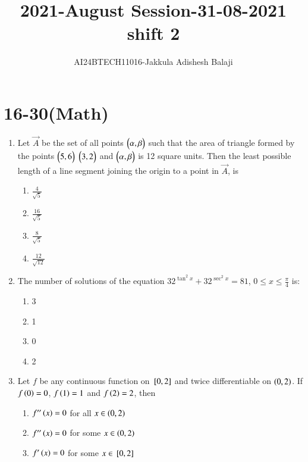 \documentclass[journal]{IEEEtran}
\begin{document}

\title{2021-August Session-31-08-2021 shift 2}
\author{AI24BTECH11016-Jakkula Adishesh Balaji}
{\let\newpage\relax\maketitle}
\renewcommand{\thefigure}{\theenumi}
\renewcommand{\thetable}{\theenumi}
\setlength{\intextsep}{10pt} %
\renewcommand{\thetable}{\theenumi}
\section{16-30(Math)}
\begin{enumerate}
	\item
	Let $\vec{A}$ be the set of all points $\begin{pmatrix}\alpha , \beta\end{pmatrix}$ such that the area of triangle formed by the points $\begin{pmatrix}5 , 6\end{pmatrix}$ $\begin{pmatrix}3 , 2\end{pmatrix}$ and $\begin{pmatrix}\alpha , \beta\end{pmatrix}$ is 12 square units. Then the least possible length of a line segment joining the origin to a point in $\vec{A}$, is 
		\begin{enumerate}
			\item  $\frac{4}{\sqrt{5}}$
			\item  $\frac{16}{\sqrt{5}}$
			\item  $\frac{8}{\sqrt{5}}$
			\item  $\frac{12}{\sqrt{12}}$
		\end{enumerate}
	\item
	The number of solutions of the equation $32^{\tan^{2}{x}} + 32^{\sec^{2}{x}} = 81$, $0 \leq x \leq \frac{\pi}{4}$ is:
		\begin{enumerate}
			\item 3
			\item 1
			\item 0
			\item 2
		\end{enumerate}
	\item 
	Let $f$ be any continuous function on ${}\left[0, 2\right]$ and twice differentiable on $\left(0, 2\right)$. If $f\left(0\right) = 0$, $f\left(1\right) = 1$ and $f\left(2\right) = 2$, then
		\begin{enumerate}
			\item  $f^{\prime\prime}\left(x\right) = 0$ for all $x \in \left(0, 2\right)$
			\item  $f^{\prime\prime}\left(x\right) = 0$ for some $x \in \left(0, 2\right)$
			\item  $f^{\prime}\left(x\right) = 0$ for some $x \in {}\left[0, 2\right]$

\end{enumerate}
\end{enumerate}
\end{document}
